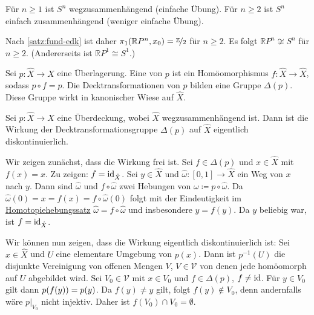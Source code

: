 \begin{bemerkung}[{name=[Fundamentalgruppe des reell-projektiven Raumes]}]
	Für $n \ge 1$ ist $S^n$ wegzusammenhängend (einfache Übung).
	Für $n \ge 2$ ist $S^n$ einfach zusammenhängend (weniger einfache Übung).
	
	Nach \cref{satz:fund-edk} ist daher $\pi_1(\mathbb{R}P^n, x_0) = \nicefrac{\mathbb{Z}}{2}$ für $n \ge 2$. 
	Es folgt $\mathbb{R}P^n \not\cong S^n$ für $n \ge 2$. 
	(Andererseits ist $\mathbb{R}P^1 \cong S^1$.)
\end{bemerkung}

\begin{definition}[{name=[Decktransformationen]}]
	Sei $p \colon \hat{X} \to X$ eine Überlagerung. 
	Eine  von $p$ ist ein Homöomorphismus $f \colon \hat{X} \to \hat{X}$, sodass $p \circ f = p$. 
	Die Decktransformationen von $p$ bilden eine Gruppe $\Delta(p)$. 
	Diese Gruppe wirkt in kanonischer Wiese auf $\hat{X}$.
\end{definition}

\begin{lemma}[{name=[Decktransformationsgruppe wirkt eigentlich diskontinuierlich]}]
	Sei $p \colon \hat{X} \to X$ eine Überdeckung, wobei $\hat{X}$ wegzusammenhängend ist. 
	Dann ist die Wirkung der Decktransformationsgruppe $\Delta(p)$ auf $\hat{X}$ eigentlich diskontinuierlich.
\end{lemma}
\begin{beweis}
	Wir zeigen zunächst, dass die Wirkung frei ist. 
	Sei $f \in \Delta(p)$ und $x \in \hat{X}$ mit $f(x) = x$. Zu zeigen: $f =\operatorname{id}_{\hat{X}}$.
	Sei $y \in \hat{X}$ und $\hat{\omega} \colon [0,1] \to \hat{X}$ ein Weg von $x$ nach $y$. 
	Dann sind $\hat{\omega}$ und $f \circ \hat{\omega}$ zwei Hebungen von $\omega \coloneqq p \circ \hat{\omega}$. 
	Da $\hat{\omega}(0) = x = f(x) = f \circ \hat{\omega}(0)$ folgt mit der Eindeutigkeit im \hyperref[satz:hebung-homotopie]{Homotopiehebungssatz} $\hat{\omega} = f \circ \hat{\omega}$ und insbesondere $y=f(y)$.
	Da $y$ beliebig war, ist $f= \operatorname{id}_{\hat{X}}$.

	Wir können nun zeigen, dass die Wirkung eigentlich diskontinuierlich ist: 
	Sei $x \in \hat{X}$ und $U$ eine elementare Umgebung von $p(x)$. 
	Dann ist $p^{-1}(U)$ die disjunkte Vereinigung von offenen Mengen $V$, $V \in \mathcal{V}$ von denen jede homöomorph auf $U$ abgebildet wird. 
	Sei $V_0 \in \mathcal{V}$ mit $x \in V_0$ und $f \in \Delta(p)$, $f \neq \operatorname{id}$. 
	Für $y \in V_0$ gilt dann $p \enbrace*{f(y)} = p(y)$. 
	Da $f(y) \neq y$ gilt, folgt $f(y) \notin V_0$, denn andernfalls wäre $p\big|_{V_0}$ nicht injektiv. 
	Daher ist $f(V_0) \cap V_0 = \emptyset$.
\end{beweis}

